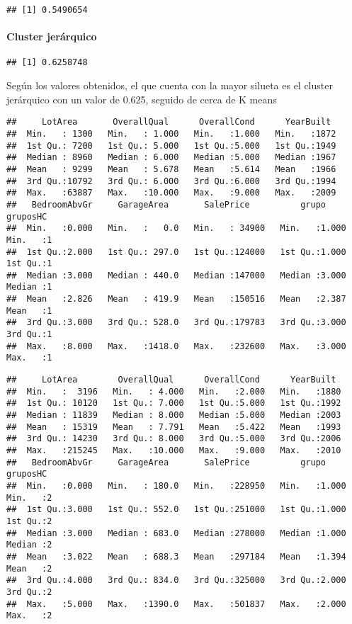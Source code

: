 \documentclass[
]{article}
\begin{document}
\begin{verbatim}
## [1] 0.5490654
\end{verbatim}

\hypertarget{cluster-jeruxe1rquico}{%
\paragraph{Cluster jerárquico}\label{cluster-jeruxe1rquico}}

\begin{verbatim}
## [1] 0.6258748
\end{verbatim}

Según los valores obtenidos, el que cuenta con la mayor silueta es el
cluster jerárquico con un valor de 0.625, seguido de cerca de K means

\begin{verbatim}
##     LotArea       OverallQual      OverallCond      YearBuilt   
##  Min.   : 1300   Min.   : 1.000   Min.   :1.000   Min.   :1872  
##  1st Qu.: 7200   1st Qu.: 5.000   1st Qu.:5.000   1st Qu.:1949  
##  Median : 8960   Median : 6.000   Median :5.000   Median :1967  
##  Mean   : 9299   Mean   : 5.678   Mean   :5.614   Mean   :1966  
##  3rd Qu.:10792   3rd Qu.: 6.000   3rd Qu.:6.000   3rd Qu.:1994  
##  Max.   :63887   Max.   :10.000   Max.   :9.000   Max.   :2009  
##   BedroomAbvGr     GarageArea       SalePrice          grupo          gruposHC
##  Min.   :0.000   Min.   :   0.0   Min.   : 34900   Min.   :1.000   Min.   :1  
##  1st Qu.:2.000   1st Qu.: 297.0   1st Qu.:124000   1st Qu.:1.000   1st Qu.:1  
##  Median :3.000   Median : 440.0   Median :147000   Median :3.000   Median :1  
##  Mean   :2.826   Mean   : 419.9   Mean   :150516   Mean   :2.387   Mean   :1  
##  3rd Qu.:3.000   3rd Qu.: 528.0   3rd Qu.:179783   3rd Qu.:3.000   3rd Qu.:1  
##  Max.   :8.000   Max.   :1418.0   Max.   :232600   Max.   :3.000   Max.   :1
\end{verbatim}

\begin{verbatim}
##     LotArea        OverallQual      OverallCond      YearBuilt   
##  Min.   :  3196   Min.   : 4.000   Min.   :2.000   Min.   :1880  
##  1st Qu.: 10120   1st Qu.: 7.000   1st Qu.:5.000   1st Qu.:1992  
##  Median : 11839   Median : 8.000   Median :5.000   Median :2003  
##  Mean   : 15319   Mean   : 7.791   Mean   :5.422   Mean   :1993  
##  3rd Qu.: 14230   3rd Qu.: 8.000   3rd Qu.:5.000   3rd Qu.:2006  
##  Max.   :215245   Max.   :10.000   Max.   :9.000   Max.   :2010  
##   BedroomAbvGr     GarageArea       SalePrice          grupo          gruposHC
##  Min.   :0.000   Min.   : 180.0   Min.   :228950   Min.   :1.000   Min.   :2  
##  1st Qu.:3.000   1st Qu.: 552.0   1st Qu.:251000   1st Qu.:1.000   1st Qu.:2  
##  Median :3.000   Median : 683.0   Median :278000   Median :1.000   Median :2  
##  Mean   :3.022   Mean   : 688.3   Mean   :297184   Mean   :1.394   Mean   :2  
##  3rd Qu.:4.000   3rd Qu.: 834.0   3rd Qu.:325000   3rd Qu.:2.000   3rd Qu.:2  
##  Max.   :5.000   Max.   :1390.0   Max.   :501837   Max.   :2.000   Max.   :2
\end{verbatim}
\end{document}
